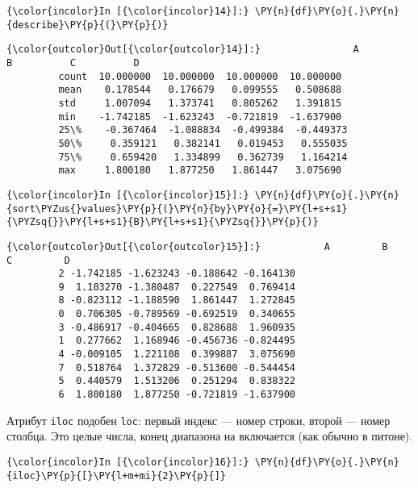     \begin{Verbatim}[commandchars=\\\{\}]
{\color{incolor}In [{\color{incolor}14}]:} \PY{n}{df}\PY{o}{.}\PY{n}{describe}\PY{p}{(}\PY{p}{)}
\end{Verbatim}

            \begin{Verbatim}[commandchars=\\\{\}]
{\color{outcolor}Out[{\color{outcolor}14}]:}                A          B          C          D
         count  10.000000  10.000000  10.000000  10.000000
         mean    0.178544   0.176679   0.099555   0.508688
         std     1.007094   1.373741   0.805262   1.391815
         min    -1.742185  -1.623243  -0.721819  -1.637900
         25\%    -0.367464  -1.088834  -0.499384  -0.449373
         50\%     0.359121   0.382141   0.019453   0.555035
         75\%     0.659420   1.334899   0.362739   1.164214
         max     1.800180   1.877250   1.861447   3.075690
\end{Verbatim}
        
    \begin{Verbatim}[commandchars=\\\{\}]
{\color{incolor}In [{\color{incolor}15}]:} \PY{n}{df}\PY{o}{.}\PY{n}{sort\PYZus{}values}\PY{p}{(}\PY{n}{by}\PY{o}{=}\PY{l+s+s1}{\PYZsq{}}\PY{l+s+s1}{B}\PY{l+s+s1}{\PYZsq{}}\PY{p}{)}
\end{Verbatim}

            \begin{Verbatim}[commandchars=\\\{\}]
{\color{outcolor}Out[{\color{outcolor}15}]:}           A         B         C         D
         2 -1.742185 -1.623243 -0.188642 -0.164130
         9  1.103270 -1.380487  0.227549  0.769414
         8 -0.823112 -1.188590  1.861447  1.272845
         0  0.706305 -0.789569 -0.692519  0.340655
         3 -0.486917 -0.404665  0.828688  1.960935
         1  0.277662  1.168946 -0.456736 -0.824495
         4 -0.009105  1.221108  0.399887  3.075690
         7  0.518764  1.372829 -0.513600 -0.544454
         5  0.440579  1.513206  0.251294  0.838322
         6  1.800180  1.877250 -0.721819 -1.637900
\end{Verbatim}
        
    Атрибут \texttt{iloc} подобен \texttt{loc}: первый индекс --- номер
строки, второй --- номер столбца. Это целые числа, конец диапазона на
включается (как обычно в питоне).

    \begin{Verbatim}[commandchars=\\\{\}]
{\color{incolor}In [{\color{incolor}16}]:} \PY{n}{df}\PY{o}{.}\PY{n}{iloc}\PY{p}{[}\PY{l+m+mi}{2}\PY{p}{]}
\end{Verbatim}


